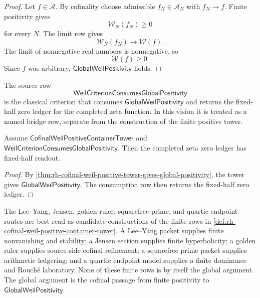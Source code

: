 \begin{proof}
Let $f\in\mathcal A$.  By cofinality choose admissible
$f_N\in\mathcal A_N$ with $f_N\to f$.  Finite positivity gives
$$
\mathcal W_N(f_N)\ge0
$$
for every $N$.  The limit row gives
$$
\mathcal W_N(f_N)\to\mathcal W(f).
$$
The limit of nonnegative real numbers is nonnegative, so
$$
\mathcal W(f)\ge0.
$$
Since $f$ was arbitrary, $\mathsf{GlobalWeilPositivity}$ holds.
\end{proof}

\begin{definition}
\label{def:rh-weil-criterion-consumption-row}
The source row
$$
\mathsf{WeilCriterionConsumesGlobalPositivity}
$$
is the classical criterion that consumes
$\mathsf{GlobalWeilPositivity}$ and returns the fixed-half zero ledger
for the completed zeta function.  In this vision it is treated as a
named bridge row, separate from the construction of the finite
positive tower.
\end{definition}

\begin{theorem}
\label{thm:rh-finite-weil-positive-tower-fixed-half-readout}
Assume $\mathsf{CofinalWeilPositiveContainerTower}$ and
$\mathsf{WeilCriterionConsumesGlobalPositivity}$.  Then the completed
zeta zero ledger has fixed-half readout.
\end{theorem}

\begin{proof}
By
\autoref{thm:rh-cofinal-weil-positive-tower-gives-global-positivity},
the tower gives $\mathsf{GlobalWeilPositivity}$.  The consumption row
then returns the fixed-half zero ledger.
\end{proof}

\begin{principle}
\label{prin:rh-finite-container-routes-as-weil-tower-candidates}
The Lee--Yang, Jensen, golden-ruler, squarefree-prime, and quartic
endpoint routes are best read as candidate constructions of the finite
rows in
\autoref{def:rh-cofinal-weil-positive-container-tower}.  A Lee--Yang
packet supplies finite nonvanishing and stability; a Jensen section
supplies finite hyperbolicity; a golden ruler supplies source-side
cofinal refinement; a squarefree prime packet supplies arithmetic
ledgering; and a quartic endpoint model supplies a finite dominance and
Rouch\'e laboratory.  None of these finite rows is by itself the global
argument.  The global argument is the cofinal passage from finite
positivity to $\mathsf{GlobalWeilPositivity}$.
\end{principle}

